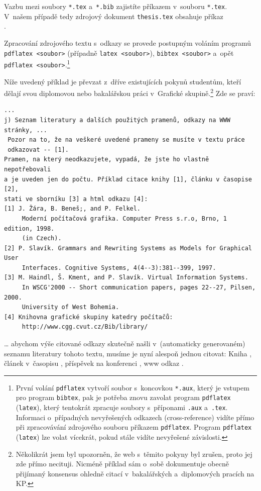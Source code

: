 \documentclass[11pt,twoside,a4paper]{book}
\begin{document}
Vazbu mezi soubory \verb|*.tex| a~\verb|*.bib| zajistíte příkazem 
\verb|| v~souboru \verb|*.tex|.  V~našem případě tedy zdrojový 
dokument \verb|thesis.tex| obsahuje příkaz\\
\verb||.

Zpracování zdrojového textu s~odkazy se provede postupným voláním programů\\
\verb|pdflatex <soubor>| (případně \verb|latex <soubor>|), \verb|bibtex <soubor>| 
a~opět\\ \verb|pdflatex <soubor>|.\footnote{První volání \texttt{pdflatex} 
vytvoří soubor s~koncovkou \texttt{*.aux}, který je vstupem pro program 
\texttt{bibtex}, pak je potřeba znovu zavolat program \texttt{pdflatex} 
(\texttt{latex}), který tentokrát zpracuje soubory s~příponami \texttt{.aux}
a~\texttt{.tex}. 
Informaci o~případných nevyřešených odkazech (cross-reference) vidíte přímo při 
zpracovávání zdrojového souboru příkazem \texttt{pdflatex}. Program \texttt{pdflatex} 
(\texttt{latex}) lze volat vícekrát, pokud stále vidíte nevyřešené závislosti.}


Níže uvedený příklad je převzat z~dříve existujících pokynů studentům, kteří 
dělají svou diplomovou nebo bakalářskou práci v~Grafické skupině.\footnote{Několikrát 
jsem byl upozorněn, že web s~těmito pokyny byl zrušen, proto jej zde přímo necituji. 
Nicméně příklad sám o~sobě dokumentuje obecně přijímaný konsensus ohledně citací 
v~bakalářských a~diplomových pracích na KP.} Zde se praví:
\begin{small}
\begin{verbatim}
...
j) Seznam literatury a dalších použitých pramenů, odkazy na WWW stránky, ...
 Pozor na to, že na veškeré uvedené prameny se musíte v textu práce 
 odkazovat -- [1]. 
Pramen, na který neodkazujete, vypadá, že jste ho vlastně nepotřebovali 
a je uveden jen do počtu. Příklad citace knihy [1], článku v časopise [2], 
stati ve sborníku [3] a html odkazu [4]: 
[1] J. Žára, B. Beneš;, and P. Felkel. 
     Moderní počítačová grafika. Computer Press s.r.o, Brno, 1 edition, 1998. 
     (in Czech). 
[2] P. Slavík. Grammars and Rewriting Systems as Models for Graphical User 
     Interfaces. Cognitive Systems, 4(4--3):381--399, 1997. 
[3] M. Haindl, Š. Kment, and P. Slavík. Virtual Information Systems. 
     In WSCG'2000 -- Short communication papers, pages 22--27, Pilsen, 2000. 
     University of West Bohemia. 
[4] Knihovna grafické skupiny katedry počítačů: 
     http://www.cgg.cvut.cz/Bib/library/ 
\end{verbatim}
\end{small}
\ldots{} abychom výše citované odkazy skutečně našli v~(automaticky generovaném) seznamu literatury tohoto textu, musíme
je nyní alespoň jednou citovat: Kniha \cite{kniha}, článek v~časopisu \cite{clanek}, příspěvek na konferenci
\cite{sbornik}, www odkaz \cite{www}.
\end{document}
